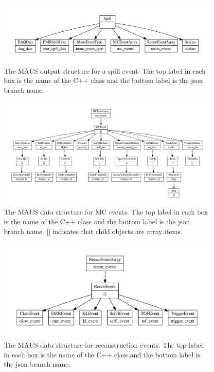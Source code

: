 \documentclass{JINST}
\begin{document}
\begin{figure}[!p]
\centering
\includegraphics[width=\textwidth]{figs/spill_datastructure.pdf}
\caption{The MAUS output structure for a spill event. The top label in each box is the name of the C++ class and the bottom label is the json branch name.}
\label{fig:datastructure-spill}
\end{figure}

\begin{figure}[ptb]
\centering
\includegraphics[width=\textwidth]{figs/mc_datastructure.pdf}
\caption{The MAUS data structure for MC events. The top label in each box is the name of the C++ class and the bottom label is the json branch name. [] indicates that child objects are array items.}
\label{fig:datastructure-mc}
\end{figure}

\begin{figure}[ptb]
\centering
\includegraphics[width=\textwidth]{figs/recon_datastructure.pdf}
\caption{The MAUS data structure for reconstruction events. The top label in each box is the name of the C++ class and the bottom label is the json branch name.}
\label{fig:datastructure-recon}
\end{figure}
\end{document}

